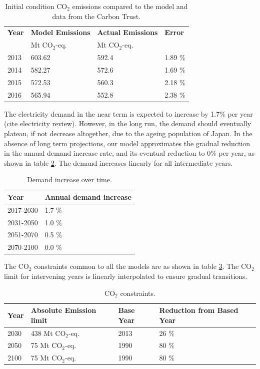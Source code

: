 \begin{table}[!ht]
	\caption{Initial condition CO$_2$ emissions compared to the model and data from the Carbon Trust.}
	\vspace{0.1in}
	\begin{tabularx}{\textwidth}{p{} p{} p{} p{}}
		\hline
\textbf{Year} & \textbf{Model Emissions} & \textbf{Actual Emissions} & \textbf{Error} \\
  & Mt CO$_2$-eq. & Mt CO$_2$-eq. &  \\
\hline
2013 & 603.62 & 592.4 & 1.89 \% \\
2014 & 582.27 & 572.6 & 1.69 \% \\
2015 & 572.53 & 560.3 & 2.18 \% \\
2016 & 565.94 & 552.8 & 2.38 \% \\
\hline 
	\end{tabularx}
\label{ic-co2}
\end{table}
The electricity demand in the near term is expected to increase by 1.7\% per year (cite electricity review). However, in the long run, the demand should eventually plateau, if not decrease altogether, due to the ageing population of Japan. In the absence of long term projections, our model approximates the gradual reduction in the annual demand increase rate, and its eventual reduction to 0\% per year, as shown in table \ref{demand}. The demand increases linearly for all intermediate years.

\begin{table}[!ht]
	\caption{Demand increase over time.}
	\vspace{0.1in}
	\begin{tabularx}{\textwidth}{p{} p{}}
		\hline
\textbf{Year} & \textbf{Annual demand increase} \\
\hline
2017-2030 & 1.7 \% \\
2031-2050 & 1.0 \% \\
2051-2070 & 0.5 \% \\
2070-2100 & 0.0 \% \\
\hline 
	\end{tabularx}
\label{demand}
\end{table}
The CO$_2$ constraints common to all the models are as shown in table \ref{co2-limits}. The CO$_2$ limit for intervening years is linearly interpolated to ensure gradual transitions. 
\begin{table}[!ht]
	\caption{CO$_2$ constraints.}
	\vspace{0.1in}
	\begin{tabularx}{\textwidth}{p{} p{}p{} p{}}
		\hline
\textbf{Year} & \textbf{Absolute Emission limit} & \textbf{Base Year} & \textbf{Reduction from Based Year} \\
\hline
2030 & 438 Mt CO$_2$-eq. & 2013 & 26 \% \\
2050 & 75 Mt CO$_2$-eq. & 1990 & 80 \% \\
2100 & 75 Mt CO$_2$-eq. & 1990 & 80 \% \\
\hline 
	\end{tabularx}
\label{co2-limits}
\end{table}

